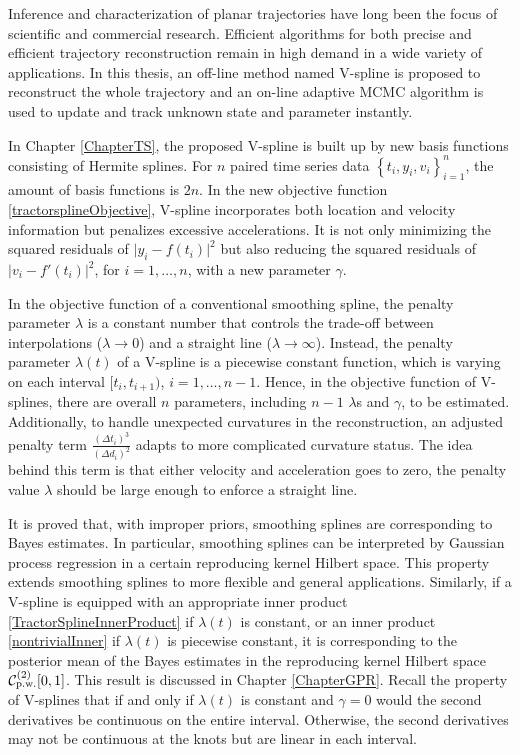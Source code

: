 
Inference and characterization of planar trajectories have long been the focus of scientific and commercial research. Efficient algorithms for both precise and efficient trajectory reconstruction remain in high demand in a wide variety of applications. In this thesis, an off-line method named V-spline is proposed to reconstruct the whole trajectory and an on-line adaptive MCMC algorithm is used to update and track unknown state and parameter instantly. 

In Chapter \ref{ChapterTS}, the proposed V-spline is built up by new basis functions consisting of Hermite splines. For $n$ paired time series data $\left\lbrace t_i,y_i,v_i\right\rbrace_{i=1}^{n}$, the amount of basis functions is $2n$. In the new objective function \eqref{tractorsplineObjective}, V-spline incorporates both location and velocity information but penalizes excessive accelerations. It is not only minimizing the squared residuals of $\lvert y_i-f(t_i)\rvert^2$ but also reducing the squared residuals of $\lvert v_i-f'(t_i)\rvert^2$, for $i=1,\ldots,n$, with a new parameter $\gamma$. 

In the objective function of a conventional smoothing spline, the penalty parameter $\lambda$ is a constant number that controls the trade-off between interpolations ($\lambda\to 0$) and a straight line ($\lambda\to \infty$). Instead, the penalty parameter $\lambda(t)$ of a V-spline is a piecewise constant function, which is varying on each interval $[t_i,t_{i+1})$, $i=1,\ldots,n-1$. Hence, in the objective function of  V-splines, there are overall $n$ parameters, including $n-1$ $\lambda$s and $\gamma$, to be estimated. Additionally, to handle unexpected curvatures in the reconstruction, an adjusted penalty term $\frac{(\Delta t_i)^3}{(\Delta d_i)^2}$ adapts to more complicated curvature status. The idea behind this term is that either velocity and acceleration goes to zero, the penalty value $\lambda$ should be large enough to enforce a straight line. 

It is proved that, with improper priors, smoothing splines are corresponding to Bayes estimates. In particular, smoothing splines can be interpreted by Gaussian process regression in a certain reproducing kernel Hilbert space. This property extends smoothing splines to more flexible and general applications. Similarly, if a V-spline is equipped with an appropriate inner product \eqref{TractorSplineInnerProduct} if $\lambda(t)$ is constant, or an inner product \eqref{nontrivialInner} if $\lambda(t)$ is piecewise constant, it is corresponding to the posterior mean of the Bayes estimates in the reproducing kernel Hilbert space $\mathcal{C}_{\mbox{\scriptsize p.w.}}^{(2)}[0,1]$. This result is discussed in Chapter \ref{ChapterGPR}. Recall the property of V-splines that if and only if $\lambda(t)$ is constant and $\gamma=0$ would the second derivatives be continuous on the entire interval. Otherwise, the second derivatives may not be continuous at the knots but are linear in each interval. 

